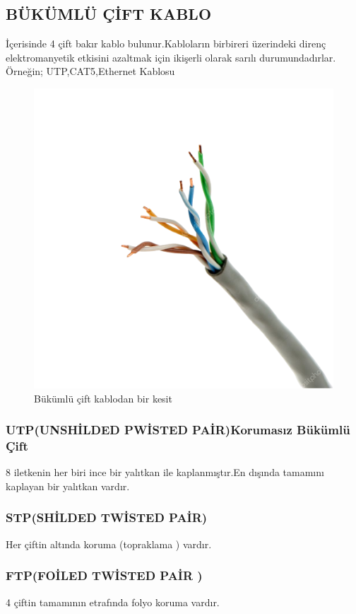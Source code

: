 \subsection{BÜKÜMLÜ ÇİFT KABLO}
  İçerisinde 4 çift bakır kablo bulunur.Kabloların birbireri üzerindeki direnç elektromanyetik etkisini azaltmak için ikişerli olarak sarılı durumundadırlar.
  Örneğin; UTP,CAT5,Ethernet Kablosu 
  \begin{figure}[!ht]
   \includegraphics{images/bukumlukablo}
   \caption{Bükümlü çift kablodan bir kesit}
 \label{fig:Bukumlu_cift_kablo}
 \end{figure}

\subsubsection{UTP(UNSHİLDED PWİSTED PAİR)Korumasız Bükümlü Çift} 
    8 iletkenin her biri ince bir yalıtkan ile kaplanmıştır.En dışında tamamını kaplayan bir yalıtkan vardır.
\subsubsection{STP(SHİLDED TWİSTED PAİR)} 
Her çiftin altında koruma (topraklama ) vardır.
\subsubsection{FTP(FOİLED TWİSTED PAİR )} 
4 çiftin tamamının etrafında folyo koruma vardır.
